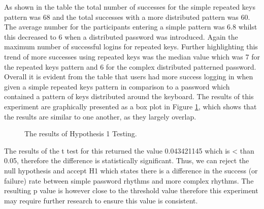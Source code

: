 \documentclass{article}
\begin{document}
As shown in the table the total number of successes for the simple repeated keys pattern was 68 and the total successes with a more distributed pattern was 60. The average number for the participants entering a simple pattern was 6.8 whilst this decreased to 6 when a distributed password was introduced. Again the maximum number of successful logins for repeated keys. Further highlighting this trend of more successes using repeated keys was the median value which was 7 for the repeated keys pattern and 6 for the complex distributed patterned password. Overall it is evident from the table that users had more success logging in when given a simple repeated keys pattern in comparison to a password which contained a pattern of keys distributed around the keyboard. The results of this experiment are graphically presented as a box plot in Figure \ref{fig:boxPlotHyp1}, which shows that the results are similar to one another, as they largely overlap.    

\begin{figure} [H]
    \centering
    \caption{The results of Hypothesis 1 Testing.}
    \label{fig:boxPlotHyp1}
\end{figure}

The results of the t test for this returned the value 0.043421145 which is < than 0.05, therefore the difference is statistically significant. Thus, we can reject the null hypothesis and accept H1 which states there is a difference in the	success	(or	failure) rate between simple password rhythms and	more complex rhythms. The resulting p value is however close to the threshold value therefore this experiment may require further research to ensure this value is consistent. 
\end{document}
